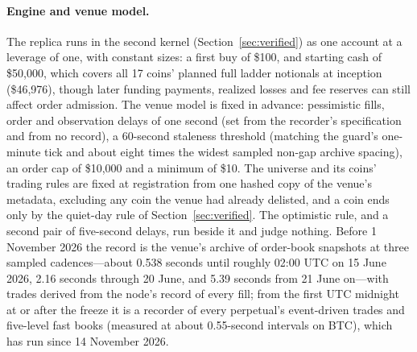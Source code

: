 \documentclass[11pt]{article}
\begin{document}
\paragraph{Engine and venue model.} The replica runs in the second kernel (Section~\ref{sec:verified}) as one account at a leverage of one, with constant sizes: a first buy of \$100, and starting cash of \$50{,}000, which covers all 17 coins' planned full ladder notionals at inception (\$46{,}976), though later funding payments, realized losses and fee reserves can still affect order admission. The venue model is fixed in advance: pessimistic fills, order and observation delays of one second (set from the recorder's specification and from no record), a 60-second staleness threshold (matching the guard's one-minute tick and about eight times the widest sampled non-gap archive spacing), an order cap of \$10{,}000 and a minimum of \$10. The universe and its coins' trading rules are fixed at registration from one hashed copy of the venue's metadata, excluding any coin the venue had already delisted, and a coin ends only by the quiet-day rule of Section~\ref{sec:verified}. The optimistic rule, and a second pair of five-second delays, run beside it and judge nothing. Before 1 November 2026 the record is the venue's archive of order-book snapshots at three sampled cadences---about 0.538 seconds until roughly 02:00 UTC on 15 June 2026, 2.16 seconds through 20 June, and 5.39 seconds from 21 June on---with trades derived from the node's record of every fill; from the first UTC midnight at or after the freeze it is a recorder of every perpetual's event-driven trades and five-level fast books (measured at about 0.55-second intervals on BTC), which has run since 14 November 2026.
\end{document}
